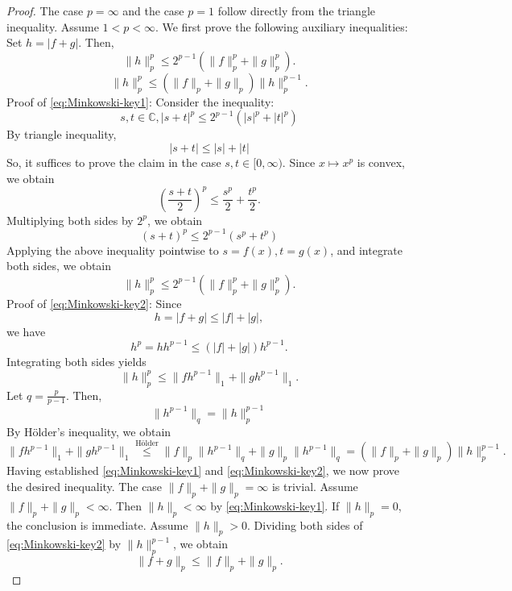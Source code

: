 \documentclass[a4paper,11pt]{article}
\theoremstyle{definition}
\theoremstyle{remark}
\begin{document}
\begin{proof}
    The case $p=\infty$ and the case $p=1$ follow directly from the triangle inequality.
    Assume $1<p<\infty$. 
    We first prove the following auxiliary inequalities:
    Set $h=|f+g|$. Then,
    \begin{equation}
         \|h\|_{p}^{p}\le2^{p-1}(\|f\|_{p}^{p}+\|g\|_{p}^{p}).
        \label{eq:Minkowski-key1}
    \end{equation}
    \begin{equation}
        \|h\|_{p}^{p}\le(\|f\|_{p}+\|g\|_{p})\|h\|_{p}^{p-1}.
        \label{eq:Minkowski-key2}
    \end{equation}
    Proof of \eqref{eq:Minkowski-key1}:
    Consider the inequality:
    \[
    s,t\in\mathbb{C}, |s+t|^p\le2^{p-1}(|s|^{p}+|t|^{p})
    \]
    By triangle inequality, 
    \[
    |s+t|\le|s|+|t|
    \]
    So, it suffices to prove the claim in the case $s,t\in[0,\infty)$.
    Since $x\mapsto{x^{p}}$ is convex, we obtain
    \[
    \left(\frac{s+t}{2}\right)^p\le\frac{s^p}{2}+\frac{t^p}{2}.
    \]
    Multiplying both sides by $2^p$, we obtain
    \[
    (s+t)^p\le2^{p-1}(s^p+t^p)
    \]
    Applying the above inequality pointwise to $s=f(x),t=g(x)$, and integrate both sides, we obtain
    \[
    \|h\|_{p}^{p}\le2^{p-1}(\|f\|_{p}^{p}+\|g\|_{p}^{p}).
    \]
    Proof of \eqref{eq:Minkowski-key2}:
    Since
    \[
    h=|f+g|\le |f|+|g|,
    \]
    we have
    \[
    h^p=hh^{p-1}\le(|f|+|g|)h^{p-1}.
    \]
    Integrating both sides yields
    \[
    \|h\|_p^p\le\|fh^{p-1}\|_1+\|gh^{p-1}\|_1.
    \]
    Let $q=\frac{p}{p-1}$. Then,
    \[
    \|h^{p-1}\|_{q}=\|h\|_{p}^{p-1}
    \]
    By H\"older's inequality, we obtain
    \[
    \|fh^{p-1}\|_{1}+\|gh^{p-1}\|_{1}\overset{\text{H\"older}}\le\|f\|_{p}\|h^{p-1}\|_{q}+\|g\|_{p}\|h^{p-1}\|_{q}=(\|f\|_{p}+\|g\|_{p})\|h\|_{p}^{p-1}.
    \]
    Having established \eqref{eq:Minkowski-key1} and \eqref{eq:Minkowski-key2}, we now prove the desired inequality.
    The case $\|f\|_{p}+\|g\|_{p}=\infty$ is trivial.
    Assume $\|f\|_{p}+\|g\|_{p}<\infty$. Then $\|h\|_{p}<\infty$ by \eqref{eq:Minkowski-key1}.
    If $\|h\|_p=0$, the conclusion is immediate.
    Assume $\|h\|_p>0$.
    Dividing both sides of \eqref{eq:Minkowski-key2} by $\|h\|_{p}^{p-1}$, we obtain
    \[
    \|f+g\|_{p}\le\|f\|_{p}+\|g\|_{p}.
    \]



\end{proof}
\end{document}
